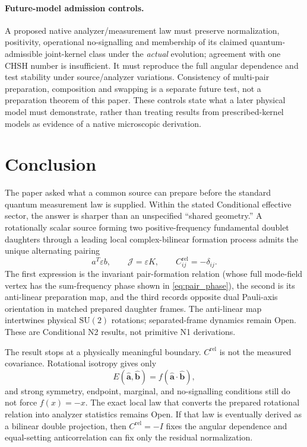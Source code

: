\documentclass[11pt]{article}
\theoremstyle{remark}
\newcommand{\SU}{\mathrm{SU}(2)}
\newcommand{\ahat}{\hat{\bm a}}
\newcommand{\bhat}{\hat{\bm b}}
\newcommand{\epsm}{\varepsilon}
\newcommand{\Jmap}{\mathcal J}
\newcommand{\Crel}{C^{\mathrm{rel}}}
\begin{document}
\paragraph{Future-model admission controls.}
A proposed native analyzer/measurement law must preserve normalization,
positivity, operational no-signalling and membership of its claimed
quantum-admissible joint-kernel class under the \emph{actual} evolution;
agreement with one CHSH number is insufficient.  It must reproduce the full
angular dependence and test stability under source/analyzer variations.
Consistency of multi-pair preparation, composition and swapping is a
separate future test, not a preparation theorem of this paper.  These
controls state what a later physical model must demonstrate, rather than
treating results from prescribed-kernel models as evidence of a native microscopic derivation.

\section{Conclusion}
\label{sec:conclusion}

The paper asked what a common source can prepare before the standard quantum measurement law is
supplied.  Within the stated Conditional effective sector, the answer is sharper than an unspecified
``shared geometry.''  A rotationally scalar source forming two positive-frequency fundamental
doublet daughters through a leading local complex-bilinear formation process admits the unique
alternating pairing
\begin{equation}
  a^T\epsm b,
  \qquad
  \Jmap=\epsm K,
  \qquad
  \Crel_{ij}=-\delta_{ij}.
  \label{eq:conclusion_result}
\end{equation}
The first expression is the invariant pair-formation relation (whose full
mode-field vertex has the sum-frequency phase shown in \eqref{eq:pair_phase}),
the second is its anti-linear
preparation map, and the third records opposite dual Pauli-axis orientation in matched
prepared daughter frames.  The anti-linear map intertwines physical \(\SU\) rotations;
separated-frame dynamics remain Open.  These are Conditional N2 results, not primitive
N1 derivations.

The result stops at a physically meaningful boundary.  \(\Crel\) is not the measured covariance.
Rotational isotropy gives only
\begin{equation}
  E(\ahat,\bhat)=f(\ahat\cdot\bhat),
  \label{eq:conclusion_general_f}
\end{equation}
and strong symmetry, endpoint, marginal, and no-signalling conditions still do not force
\(f(x)=-x\).  The exact local law that converts the prepared rotational relation into analyzer
statistics remains Open.  If that law is eventually derived as a bilinear double projection, then
\(\Crel=-I\) fixes the angular dependence and equal-setting anticorrelation can fix only the residual
normalization.
\end{document}
